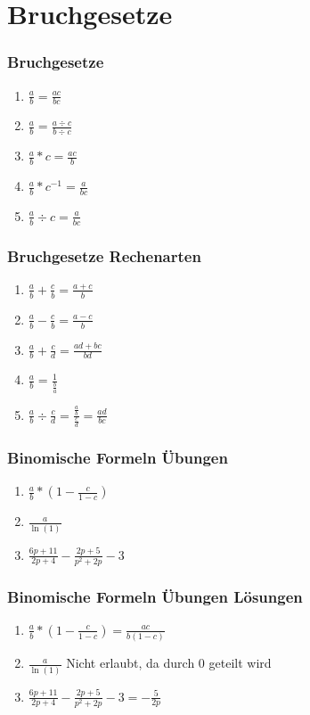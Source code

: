 \section{Bruchgesetze}
\begin{frame}
    \frametitle{Bruchgesetze}
	\begin{enumerate}
		\setlength\itemsep{1em}
		\item $\frac{a}{b}=\frac{ac}{bc}$
		\item $\frac{a}{b}=\frac{a \div c}{b \div c}$
		\item $\frac{a}{b}*c=\frac{ac}{b}$
		\item $\frac{a}{b}*c^{-1}=\frac{a}{bc}$
		\item $\frac{a}{b} \div c=\frac{a}{bc}$
	\end{enumerate}
\end{frame}

\begin{frame}
    \frametitle{Bruchgesetze Rechenarten}
	\begin{enumerate}
		\setlength\itemsep{1em}
		\item $\frac{a}{b} + \frac{c}{b}=\frac{a+c}{b}$
		\item $\frac{a}{b} - \frac{c}{b}=\frac{a-c}{b}$
		\item $\frac{a}{b} + \frac{c}{d}=\frac{ad+bc}{bd}$
		\item $\frac{a}{b} = \frac{1}{\frac{b}{a}}$
		\item $\frac{a}{b} \div \frac{c}{d} = \frac{\frac{a}{b}}{\frac{c}{d}} = \frac{ad}{bc}$
	\end{enumerate}
\end{frame}


\begin{frame}
    \frametitle{Binomische Formeln Übungen}
	\begin{enumerate}
		\setlength\itemsep{1em}
		\item $\frac{a}{b} * (1 - \frac{c}{1-c})$ 
		\item $\frac{a}{\ln(1)}$
		\item $\frac{6p + 11}{2p + 4} - \frac{2p + 5}{p^2 +2p} -3$
	\end{enumerate}
\end{frame}

\begin{frame}
    \frametitle{Binomische Formeln Übungen Lösungen}
	\begin{enumerate}
		\setlength\itemsep{1em}
		\item $\frac{a}{b} * (1 - \frac{c}{1-c}) = \frac{ac}{b(1-c)}$
		\item $\frac{a}{\ln(1)}$ Nicht erlaubt, da durch 0 geteilt wird
		\item $\frac{6p + 11}{2p + 4} - \frac{2p + 5}{p^2 +2p} -3 = -\frac{5}{2p}$
	\end{enumerate}
\end{frame}


